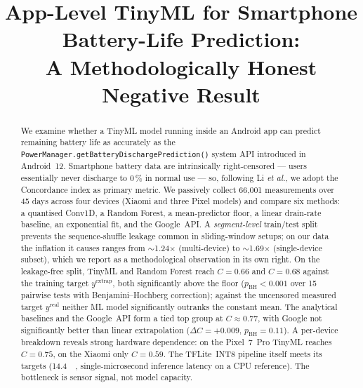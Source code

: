 \documentclass[conference]{IEEEtran}
\begin{document}
\title{App-Level TinyML for Smartphone Battery-Life Prediction:\\
A Methodologically Honest Negative Result}

\author{
}

\maketitle

\begin{abstract}
We examine whether a TinyML model running inside an Android app can
predict remaining battery life as accurately as the
\texttt{PowerManager.getBatteryDischargePrediction()} system API
introduced in Android~12. Smartphone battery data are intrinsically
right-censored --- users essentially never discharge to 0\,\% in
normal use --- so, following Li \emph{et al.}, we adopt the
Concordance index as primary metric. We passively collect 66{,}001
measurements over 45 days across four devices (Xiaomi and three
Pixel models) and compare six methods: a quantised Conv1D, a Random
Forest, a mean-predictor floor, a linear drain-rate baseline, an
exponential fit, and the Google~API. A \emph{segment-level}
train/test split prevents the sequence-shuffle leakage common in
sliding-window setups; on our data the inflation it causes ranges
from $\sim$1.24$\times$ (multi-device) to $\sim$1.69$\times$
(single-device subset), which we report as a methodological
observation in its own right. On the leakage-free split, TinyML and
Random Forest reach $C{=}0.66$ and $C{=}0.68$ against the training
target $y^{\text{extrap}}$, both significantly above the floor
($p_{\text{BH}} < 0.001$ over 15 pairwise tests with
Benjamini--Hochberg correction); against the uncensored measured
target $y^{\text{real}}$ neither ML model significantly outranks the
constant mean. The analytical baselines and the Google~API form a
tied top group at $C \approx 0.77$, with Google not significantly
better than linear extrapolation ($\Delta C{=}{+}0.009$,
$p_{\text{BH}}{=}0.11$). A per-device breakdown reveals strong
hardware dependence: on the Pixel~7~Pro TinyML reaches $C{=}0.75$,
on the Xiaomi only $C{=}0.59$. The TFLite~INT8 pipeline itself meets
its targets (\SI{14.4}{\kilo\byte}, single-microsecond inference
latency on a CPU reference). The bottleneck is sensor signal, not
model capacity.
\end{abstract}
\end{document}
